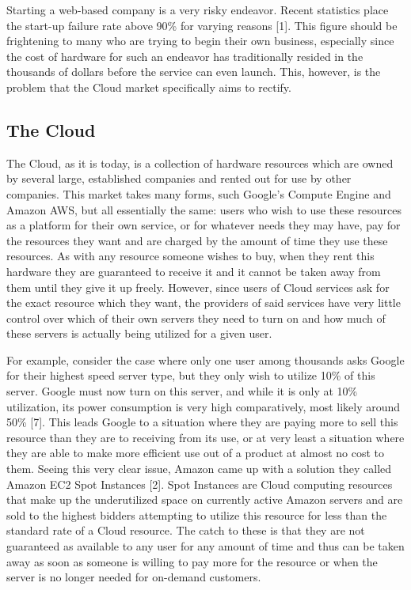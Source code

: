 \documentclass[thesis,proposal]{umassthesis}  %
\begin{document}
Starting a web-based company is a very risky endeavor. Recent statistics place the start-up failure rate above 90\% for varying reasons [1]. This figure should be frightening to many who are trying to begin their own business, especially since the cost of hardware for such an endeavor has traditionally resided in the thousands of dollars before the service can even launch. This, however, is the problem that the Cloud market specifically aims to rectify.

\subsection{The Cloud}
The Cloud, as it is today, is a collection of hardware resources which are owned by several large, established companies and rented out for use by other companies. This market takes many forms, such Google’s Compute Engine and Amazon AWS, but all essentially the same: users who wish to use these resources as a platform for their own service, or for whatever needs they may have, pay for the resources they want and are charged by the amount of time they use these resources. As with any resource someone wishes to buy, when they rent this hardware they are guaranteed to receive it and it cannot be taken away from them until they give it up freely. However, since users of Cloud services ask for the exact resource which they want, the providers of said services have very little control over which of their own servers they need to turn on and how much of these servers is actually being utilized for a given user.\par
	For example, consider the case where only one user among thousands asks Google for their highest speed server type, but they only wish to utilize 10\% of this server. Google must now turn on this server, and while it is only at 10\% utilization, its power consumption is very high comparatively, most likely around 50\% [7]. This leads Google to a situation where they are paying more to sell this resource than they are to receiving from its use, or at very least a situation where they are able to make more efficient use out of a product at almost no cost to them. Seeing this very clear issue, Amazon came up with a solution they called Amazon EC2 Spot Instances [2]. Spot Instances are Cloud computing resources that make up the underutilized space on currently active Amazon servers and are sold to the highest bidders attempting to utilize this resource for less than the standard rate of a Cloud resource. The catch to these is that they are not guaranteed as available to any user for any amount of time and thus can be taken away as soon as someone is willing to pay more for the resource or when the server is no longer needed for on-demand customers.\par
\end{document}
